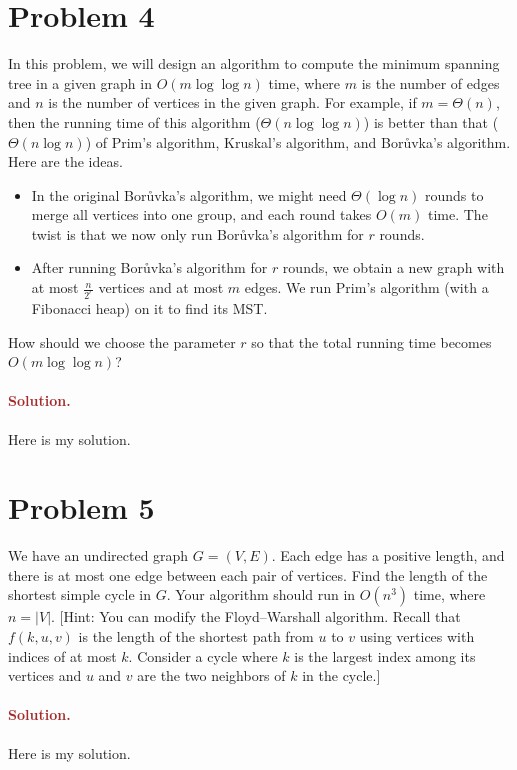 \section*{Problem 4}
In this problem, we will design an algorithm to compute the minimum spanning tree in a given graph in $O(m \log \log n)$ time, where $m$ is the number of edges and $n$ is the number of vertices in the given graph. For example, if $m = \Theta(n)$, then the running time of this algorithm ($\Theta(n \log \log n)$) is better than that ($\Theta(n \log n)$) of Prim's algorithm, Kruskal's algorithm, and Bor\r{u}vka's algorithm.
Here are the ideas.
\begin{itemize}
    \item In the original Bor\r{u}vka's algorithm, we might need $\Theta(\log n)$ rounds to merge all vertices into one group, and each round takes $O(m)$ time. The twist is that we now only run Bor\r{u}vka's algorithm for $r$ rounds.
    \item After running Bor\r{u}vka's algorithm for $r$ rounds, we obtain a new graph with at most $\frac{n}{2^r}$ vertices and at most $m$ edges. We run Prim's algorithm (with a Fibonacci heap) on it to find its MST.
\end{itemize}
How should we choose the parameter $r$ so that the total running time becomes $O(m \log \log n)$?

\paragraph{\textcolor{brown}{Solution.}}
Here is my solution.


\section*{Problem 5}
We have an undirected graph $G = (V, E)$. Each edge has a positive length, and there is at most one edge between each pair of vertices. Find the length of the shortest simple cycle in $G$. Your algorithm should run in $O(n^3)$ time, where $n = |V|$. [Hint: You can modify the Floyd--Warshall algorithm. Recall that $f(k, u, v)$ is the length of the shortest path from $u$ to $v$ using vertices with indices of at most $k$. Consider a cycle where $k$ is the largest index among its vertices and $u$ and $v$ are the two neighbors of $k$ in the cycle.]

\paragraph{\textcolor{brown}{Solution.}}
Here is my solution.

